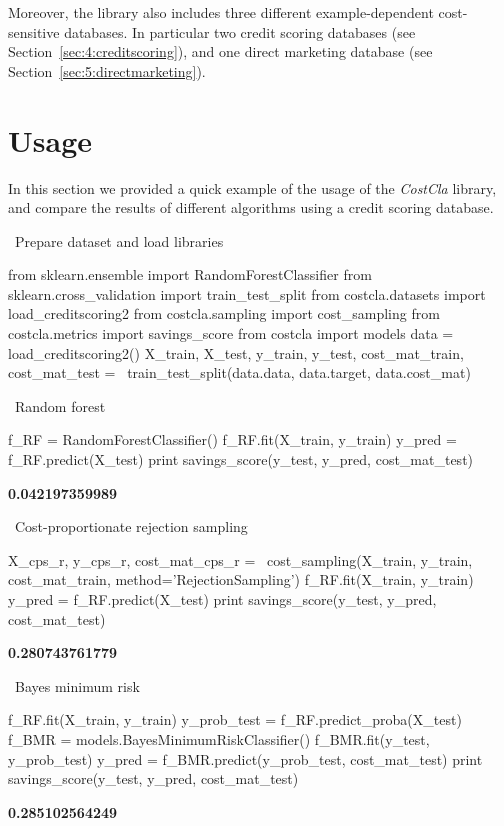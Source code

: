 Moreover, the library also includes three different example-dependent cost-sensitive databases. In 
particular two credit scoring databases (see Section~\ref{sec:4:creditscoring}), and one direct marketing
 database (see Section~\ref{sec:5:directmarketing}). 

\section{Usage}

In this section we provided a quick example of the usage of the \textit{CostCla}  library, and 
compare the results of different algorithms using a credit scoring database.

\vskip0.3cm
\noindent \textbullet\ Prepare dataset and load libraries

\vskip0.3cm
\begin{pythoncode}
from sklearn.ensemble import RandomForestClassifier
from sklearn.cross_validation import train_test_split
from costcla.datasets import load_creditscoring2
from costcla.sampling import cost_sampling
from costcla.metrics import savings_score
from costcla import models
data = load_creditscoring2()
X_train, X_test, y_train, y_test, 
cost_mat_train, cost_mat_test = \
train_test_split(data.data, data.target, data.cost_mat)
\end{pythoncode}

\vskip0.3cm
\noindent\textbullet\ Random forest

\vskip0.3cm
\begin{pythoncode}
f_RF = RandomForestClassifier()
f_RF.fit(X_train, y_train)
y_pred = f_RF.predict(X_test)
print savings_score(y_test, y_pred, cost_mat_test)
\end{pythoncode}
\textbf{0.042197359989}

\vskip0.3cm
\noindent \textbullet\ Cost-proportionate rejection sampling

\vskip0.3cm
\begin{pythoncode}
X_cps_r, y_cps_r, cost_mat_cps_r =  \ 
cost_sampling(X_train, y_train, cost_mat_train, 
              method='RejectionSampling')
f_RF.fit(X_train, y_train)
y_pred = f_RF.predict(X_test)
print savings_score(y_test, y_pred, cost_mat_test)
\end{pythoncode}
\textbf{0.280743761779}

\newpage
\noindent \textbullet\ Bayes minimum risk

\vskip0.3cm
\begin{pythoncode}
f_RF.fit(X_train, y_train)
y_prob_test = f_RF.predict_proba(X_test)
f_BMR = models.BayesMinimumRiskClassifier()
f_BMR.fit(y_test, y_prob_test)
y_pred = f_BMR.predict(y_prob_test, cost_mat_test)
print savings_score(y_test, y_pred, cost_mat_test)
\end{pythoncode}
\textbf{0.285102564249}

